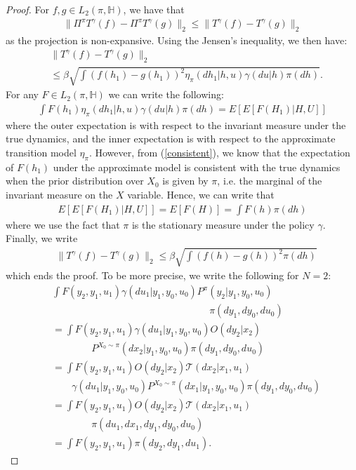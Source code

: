 \documentclass[letterpaper, 10 pt, conference]{ieeeconf}  %
\theoremstyle{definition}
\theoremstyle{remark}
\begin{document}
\begin{proof}
For $f,g \in L_2(\pi,\mathds{H})$, we have that
\begin{align*}
\|\Pi^\pi T^\gamma (f) - \Pi^\pi T^\gamma (g)\|_2 \leq  \| T^\gamma (f) -  T^\gamma (g)\|_2 
\end{align*}
as the projection is non-expansive. Using the Jensen's inequality, we then have:
\begin{align*}
&\| T^\gamma (f) -  T^\gamma (g)\|_2\\
& \leq \beta \sqrt{   \int \left(f(h_1) - g(h_1)\right)^2\eta_\pi(dh_1|h,u)\gamma(du|h) \pi(dh) }.
\end{align*}
For any $F\in L_2(\pi,\mathds{H})$ we can write the following:
\begin{align*}
\int F(h_1)\eta_\pi(dh_1|h,u)\gamma(du|h) \pi(dh) = E\left[ {E}[F(H_1)|H,U] \right]
\end{align*}
where the outer expectation is with respect to the invariant measure under the true dynamics, and the inner expectation is with respect to the approximate  transition model $\eta_\pi$. However, from (\ref{consistent}), we know that the expectation of $F(h_1)$ under the approximate model is consistent with the true dynamics when the prior distribution over $X_0$ is given by $\pi$, i.e. the marginal of the invariant measure on the $X$ variable. Hence, we can write that
\begin{align*}
E\left[ {E}[F(H_1)|H,U] \right]= E[F(H)]=\int F(h)\pi(dh)
\end{align*}
where we use the fact that $\pi$ is the stationary measure under the policy $\gamma$. Finally, we write
\begin{align*}
&\| T^\gamma (f) -  T^\gamma (g)\|_2 \leq \beta \sqrt{   \int \left(f(h) - g(h)\right)^2\pi(dh) }
\end{align*}
which ends the proof.
To be more precise, we write the following for $N=2$:
\begin{align*}
&\int F(y_2,y_1,u_1)\gamma(du_1|y_1,y_0,u_0)P^\pi(y_2|y_1,y_0,u_0)\\
&\qquad\qquad\qquad\qquad\qquad\qquad\qquad\qquad\pi(dy_1,dy_0,du_0)\\
&=\int F(y_2,y_1,u_1)\gamma(du_1|y_1,y_0,u_0)O(dy_2|x_2)\\
&\qquad\qquad P^{X_0\sim \pi}(dx_2| y_1,y_0,u_0)\pi(dy_1,dy_0,du_0)\\
&=\int  F(y_2,y_1,u_1)O(dy_2|x_2)\mathcal{T}(dx_2|x_1,u_1)\\
&\qquad \gamma(du_1|y_1,y_0,u_0) P^{X_0\sim \pi}(dx_1| y_1,y_0,u_0)\pi(dy_1,dy_0,du_0)\\
&=\int  F(y_2,y_1,u_1)O(dy_2|x_2)\mathcal{T}(dx_2|x_1,u_1)\\
&\qquad\qquad \pi(du_1,dx_1,dy_1,dy_0,du_0)\\
&=\int  F(y_2,y_1,u_1)\pi(dy_2,dy_1,du_1).
\end{align*}
\end{proof}
\end{document}
